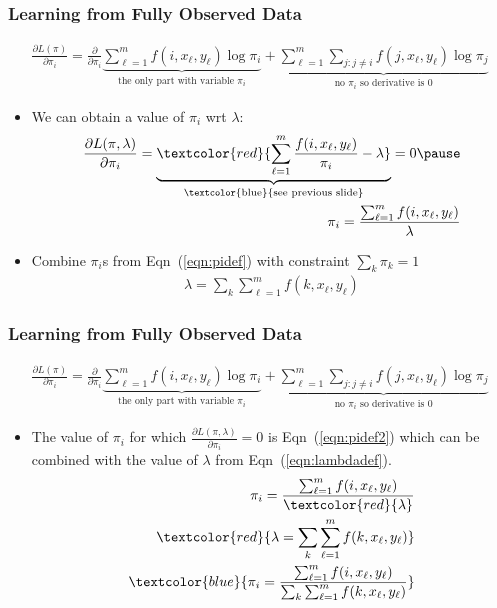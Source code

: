 \begin{frame}
\frametitle{Learning from Fully Observed Data}
{\small\begin{eqnarray*} \frac{\partial L(\pi)}{\partial \pi_i} = \frac{\partial }{\partial \pi_i} \underbrace{\sum_{\ell=1}^m f(i,x_\ell,y_\ell) \log \pi_i}_{\textrm{the only part with variable $\pi_i$}} + \underbrace{\sum_{\ell=1}^m \sum_{j : j \neq i}  f(j,x_\ell,y_\ell) \log \pi_j}_{\textrm{no $\pi_i$ so derivative is $0$}} \end{eqnarray*}}
\begin{itemize}[<+->]
\item We can obtain a value of $\pi_i$ wrt $\lambda$: \pause
\begin{eqnarray}
\frac{\partial L(\pi, \lambda)}{\partial \pi_i} = \underbrace{\textcolor{red}{\sum_{\ell=1}^m \frac{f(i,x_\ell,y_\ell)}{\pi_i} - \lambda}}_{\textrm{\textcolor{blue}{see previous slide}}} = 0 \nonumber \pause \\
\pi_i = \frac{\sum_{\ell=1}^m f(i, x_\ell, y_\ell)}{\lambda} \label{eqn:pidef}
\end{eqnarray}
\item Combine $\pi_i$s from Eqn~(\ref{eqn:pidef}) with constraint $\sum_k \pi_k = 1$
\begin{eqnarray*}
\lambda = \sum_k \sum_{\ell=1}^m f(k, x_\ell, y_\ell)
\end{eqnarray*}
\end{itemize}
\end{frame}

\begin{frame}
\frametitle{Learning from Fully Observed Data}
{\small\begin{eqnarray*} \frac{\partial L(\pi)}{\partial \pi_i} = \frac{\partial }{\partial \pi_i} \underbrace{\sum_{\ell=1}^m f(i,x_\ell,y_\ell) \log \pi_i}_{\textrm{the only part with variable $\pi_i$}} + \underbrace{\sum_{\ell=1}^m \sum_{j : j \neq i}  f(j,x_\ell,y_\ell) \log \pi_j}_{\textrm{no $\pi_i$ so derivative is $0$}} \end{eqnarray*}}
\begin{itemize}[<+->]
\item The value of $\pi_i$ for which $\frac{\partial L(\pi, \lambda)}{\partial \pi_i} = 0$ is Eqn~(\ref{eqn:pidef2}) which can be combined with the value of $\lambda$ from Eqn~(\ref{eqn:lambdadef}).
\begin{eqnarray}
\pi_i = \frac{\sum_{\ell=1}^m f(i, x_\ell, y_\ell)}{\textcolor{red}{\lambda}} \label{eqn:pidef2} \\
\textcolor{red}{\lambda = \sum_k \sum_{\ell=1}^m f(k, x_\ell, y_\ell)} \label{eqn:lambdadef} \\
\textcolor{blue}{\pi_i = \frac{\sum_{\ell=1}^m f(i, x_\ell, y_\ell)}{\sum_k \sum_{\ell=1}^m f(k, x_\ell, y_\ell)}}  \nonumber
\end{eqnarray}
\end{itemize}
\end{frame}

